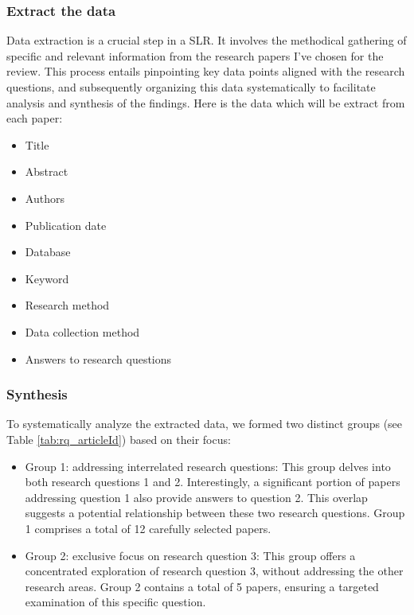 \subsubsection{Extract the data}
Data extraction is a crucial step in a SLR. It involves the methodical gathering of specific and relevant information from the research papers I've chosen for the review. This process entails pinpointing key data points aligned with the research questions, and subsequently organizing this data systematically to facilitate analysis and synthesis of the findings.
Here is the data which will be extract from each paper:
\begin{itemize}
    \item Title
    \item Abstract
    \item Authors
    \item Publication date
    \item Database
    \item Keyword
    \item Research method
    \item Data collection method
    \item Answers to research questions
\end{itemize}

\subsubsection{Synthesis}

To systematically analyze the extracted data, we formed two distinct groups (see Table \ref{tab:rq_articleId}) based on their focus:

\begin{itemize}
    \item Group 1: addressing interrelated research questions: This group delves into both research questions 1 and 2. Interestingly, a significant portion of papers addressing question 1 also provide answers to question 2. This overlap suggests a potential relationship between these two research questions. Group 1 comprises a total of 12 carefully selected papers.
    \item Group 2: exclusive focus on research question 3: This group offers a concentrated exploration of research question 3, without addressing the other research areas. Group 2 contains a total of 5 papers, ensuring a targeted examination of this specific question.
\end{itemize}


